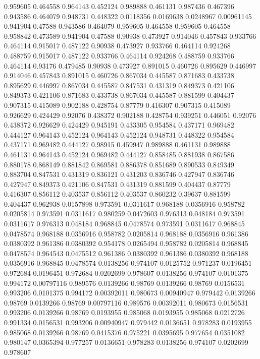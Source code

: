 0.959605 0.464558
0.964143 0.452124
0.989888 0.461131
0.987436 0.467396
0.943586 0.464079
0.948731 0.448322
0.0118356 0.0169638
0.0248967 0.00961145
0.941904 0.47588
0.943586 0.464079
0.959605 0.464558
0.959605 0.464558
0.958842 0.473589
0.941904 0.47588
0.90938 0.473927
0.914046 0.457843
0.933766 0.464114
0.915017 0.487122
0.90938 0.473927
0.933766 0.464114
0.924268 0.488759
0.915017 0.487122
0.933766 0.464114
0.924268 0.488759
0.933766 0.464114
0.93176 0.479485
0.90938 0.473927
0.891015 0.460726
0.895629 0.446997
0.914046 0.457843
0.891015 0.460726
0.867034 0.445587
0.871683 0.433738
0.895629 0.446997
0.867034 0.445587
0.847531 0.431319
0.849373 0.421106
0.849373 0.421106
0.871683 0.433738
0.867034 0.445587
0.881599 0.404437
0.907315 0.415089
0.902188 0.428754
0.87779 0.416307
0.907315 0.415089
0.926629 0.424429
0.92076 0.438372
0.902188 0.428754
0.939251 0.446051
0.92076 0.438372
0.926629 0.424429
0.945191 0.433305
0.954584 0.437171
0.969482 0.444127
0.964143 0.452124
0.964143 0.452124
0.948731 0.448322
0.954584 0.437171
0.969482 0.444127
0.98915 0.459947
0.989888 0.461131
0.989888 0.461131
0.964143 0.452124
0.969482 0.444127
0.858485 0.881938
0.867586 0.880178
0.868149 0.881842
0.869581 0.886378
0.851689 0.890533
0.849349 0.883704
0.847531 0.431319
0.836121 0.431203
0.836746 0.427947
0.836746 0.427947
0.849373 0.421106
0.847531 0.431319
0.881599 0.404437
0.87779 0.416307
0.856112 0.403537
0.856112 0.403537
0.860232 0.39637
0.881599 0.404437
0.962938 0.0157898
0.973591 0.0311617
0.968188 0.0356916
0.958782 0.0205814
0.973591 0.0311617
0.980259 0.0472603
0.976313 0.048184
0.973591 0.0311617
0.976313 0.048184
0.968845 0.0478574
0.973591 0.0311617
0.968845 0.0478574
0.968188 0.0356916
0.958782 0.0205814
0.968188 0.0356916
0.961386 0.0380392
0.961386 0.0380392
0.954178 0.0265494
0.958782 0.0205814
0.968845 0.0478574
0.964543 0.0475512
0.961386 0.0380392
0.961386 0.0380392
0.968188 0.0356916
0.968845 0.0478574
0.0138256 0.974107
0.0125752 0.971237
0.0196451 0.972684
0.0196451 0.972684
0.0202699 0.978607
0.0138256 0.974107
0.0101375 0.994172
0.00797116 0.989576
0.0139266 0.98769
0.0139266 0.98769
0.0156531 0.993206
0.0101375 0.994172
0.00392011 0.980673
0.00940947 0.979442
0.0139266 0.98769
0.0139266 0.98769
0.00797116 0.989576
0.00392011 0.980673
0.0156531 0.993206
0.0139266 0.98769
0.0193955 0.985068
0.0193955 0.985068
0.0212726 0.991334
0.0156531 0.993206
0.00940947 0.979442
0.0136651 0.978283
0.0193955 0.985068
0.0139266 0.98769
0.0415376 0.975221
0.0395695 0.977654
0.0351082 0.980147
0.0365394 0.977257
0.0136651 0.978283
0.0138256 0.974107
0.0202699 0.978607
